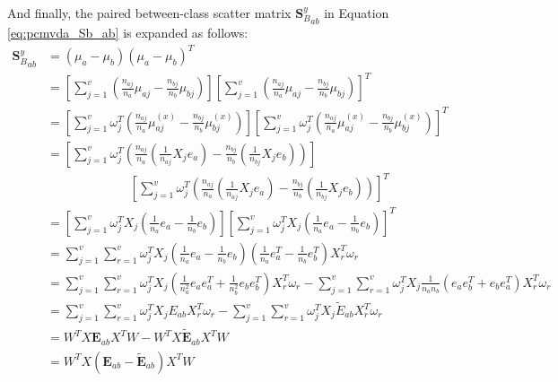 \begin{appendix}
    And finally, the paired between-class scatter matrix ${\boldsymbol{S}_B^y}_{ab}$ in Equation \eqref{eq:pcmvda_Sb_ab} is expanded as follows:
    \begin{equation}
        \begin{split}
            {\boldsymbol{S}_B^y}_{ab} &= {\left(\mu_a-\mu_b\right)\left(\mu_a-\mu_b\right)^T} \\
            &= \left[\sum_{j=1}^{v}\left(\frac{n_{aj}}{n_a}\mu_{aj} - \frac{n_{bj}}{n_b}\mu_{bj}\right)\right] \left[\sum_{j=1}^{v}\left(\frac{n_{aj}}{n_a}\mu_{aj} - \frac{n_{bj}}{n_b}\mu_{bj}\right)\right]^T \\
            &= \left[\sum_{j=1}^{v}\omega_j^T\left(\frac{n_{aj}}{n_a}\mu^{(x)}_{aj} - \frac{n_{bj}}{n_b}\mu^{(x)}_{bj}\right)\right] \left[\sum_{j=1}^{v}\omega_j^T\left(\frac{n_{aj}}{n_a}\mu^{(x)}_{aj} - \frac{n_{bj}}{n_b}\mu^{(x)}_{bj}\right)\right]^T \\
            &= \left[\sum_{j=1}^{v}\omega_j^T\left(\frac{n_{aj}}{n_a}\left(\frac{1}{n_{aj}}X_j e_a\right) - \frac{n_{bj}}{n_b}\left(\frac{1}{n_{bj}}X_j e_b\right)\right)\right] \\
            &\ \ \ \ \ \ \ \ \ \ \ \ \ \ \ \ \ \ \ \ \ \ \ \ \ \ \ \ \ \ \left[\sum_{j=1}^{v}\omega_j^T\left(\frac{n_{aj}}{n_a}\left(\frac{1}{n_{aj}}X_j e_a\right) - \frac{n_{bj}}{n_b}\left(\frac{1}{n_{bj}}X_j e_b\right)\right)\right]^T \\
            &= \left[\sum_{j=1}^{v}\omega_j^T X_j\left(\frac{1}{n_a}e_a - \frac{1}{n_b}e_b\right)\right] \left[\sum_{j=1}^{v}\omega_j^T X_j\left(\frac{1}{n_a}e_a - \frac{1}{n_b}e_b\right)\right]^T \\
            &= \sum_{j=1}^{v}\sum_{r=1}^{v}\omega_j^T X_j \left(\frac{1}{n_a}e_a - \frac{1}{n_b}e_b\right) \left(\frac{1}{n_a}e_a^T - \frac{1}{n_b}e_b^T\right) X_r^T\omega_r \\
            &= \sum_{j=1}^{v}\sum_{r=1}^{v}\omega_j^T X_j \left(\frac{1}{n_a^2}e_a e_a^T + \frac{1}{n_b^2}e_b e_b^T\right) X_r^T\omega_r - \sum_{j=1}^{v}\sum_{r=1}^{v}\omega_j^T X_j \frac{1}{n_a n_b}\left(e_a e_b^T + e_b e_a^T\right) X_r^T\omega_r \\
            &= \sum_{j=1}^{v}\sum_{r=1}^{v}\omega_j^T X_j E_{ab} X_r^T\omega_r - \sum_{j=1}^{v}\sum_{r=1}^{v}\omega_j^T X_j \tilde{E}_{ab} X_r^T\omega_r \\
            &= W^T X \boldsymbol{E}_{ab} X^T W - W^T X \boldsymbol{\tilde{E}}_{ab} X^T W \\
            &= W^T X \left(\boldsymbol{E}_{ab} - \boldsymbol{\tilde{E}}_{ab}\right) X^T W \\

\end{split}
\end{equation}
\end{appendix}
